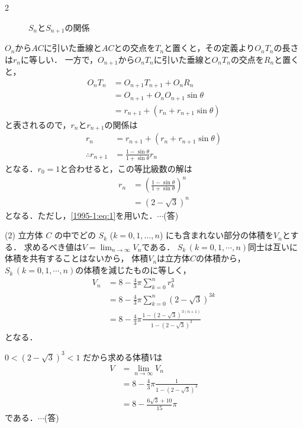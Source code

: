 \documentclass[../../main.tex]{subfiles}
\begin{document}
\begin{multicols}{2}
\begin{figure}[H]
    \caption{$S_n$と$S_{n+1}$の関係}
    \label{1995-1:fig:3}
  \end{figure}

  $O_n$から$AC$に引いた垂線と$AC$との交点を$T_n$と置くと，その定義より$O_nT_n$の長さは$r_n$に等しい．
  一方で，$O_{n+1}$から$O_nT_n$に引いた垂線と$O_nT_n$の交点を$R_n$と置くと，
  \begin{align*}
    O_nT_n
     & =O_{n+1}T_{n+1}+O_nR_n                        \\
     & =O_{n+1}+O_nO_{n+1}\sin\theta                 \\
     & =r_{n+1}+\left(r_{n}+r_{n+1}\sin\theta\right)
  \end{align*}
  と表されるので，$r_n$と$r_{n+1}$の関係は
  \begin{align}
    r_{n}
            & =r_{n+1}+(r_{n}+r_{n+1}\sin\theta)        \\
    \therefore
    r_{n+1} & = \frac{1-\sin\theta}{1+\sin\theta} r_{n}
  \end{align}
  となる．$r_0=1$と合わせると，この等比級数の解は
  \begin{align}
    r_{n}
     & = \left(\frac{1-\sin\theta}{1+\sin\theta}\right)^n \\
     & = (2-\sqrt{3})^n
  \end{align}
  となる．ただし，\cref{1995-1:eq:1}を用いた．$\cdots$(答)

  \vspace{10pt}
  (2)
  立方体 $C$ の中でどの $S_k$ ($k=0,1,\ldots, n$) にも含まれない部分の体積を$V_n$とする．
  求めるべき値は$\displaystyle V = \lim_{n\to\infty}V_n$である．
  $S_k\, (k=0,1,\cdots,n)$同士は互いに体積を共有することはないから，
  体積$V_n$は立方体$C$の体積から，$S_k\, (k=0,1,\cdots,n)$の体積を減じたものに等しく，
  \begin{align*}
    V_n & = 8 - \frac{4}{3}\pi \sum_{k=0}^{n} r_k^3                             \\
        & = 8 - \frac{4}{3}\pi \sum_{k=0}^{n} (2-\sqrt{3})^{3k}                 \\
        & = 8 - \frac{4}{3}\pi \frac{1-(2-\sqrt{3})^{3(n+1)}}{1-(2-\sqrt{3})^3}
  \end{align*}
  となる．

  $0<(2-\sqrt{3})^3 < 1$ だから求める体積$V$は
  \begin{align*}
    V & = \lim_{n \to \infty} V_n                       \\
      & = 8 - \frac{4}{3}\pi \frac{1}{1-(2-\sqrt{3})^3} \\
      & = 8 - \frac{6\sqrt{3}+10}{15}\pi
  \end{align*}
  である．$\cdots$(答)


\end{multicols}
\end{document}
